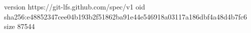 version https://git-lfs.github.com/spec/v1
oid sha256:e48852347cee04b193b2f51862ba91e44e546918a03117a186dbf4a48d4b7fc6
size 87544
